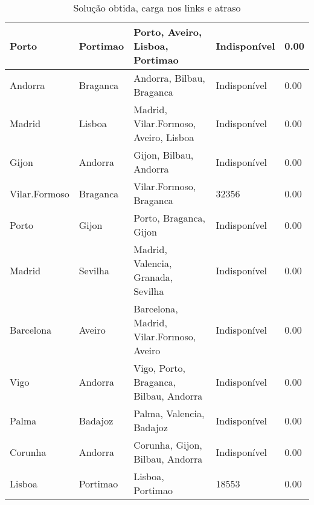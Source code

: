 \begin{table}[!htb]
{\begin{tabular}{|l|l|l|l|l|}
Porto & Portimao & Porto, Aveiro, Lisboa, Portimao & Indisponível & 0.00 \\ \hline
Andorra & Braganca & Andorra, Bilbau, Braganca & Indisponível & 0.00 \\ \hline
Madrid & Lisboa & Madrid, Vilar.Formoso, Aveiro, Lisboa & Indisponível & 0.00 \\ \hline
Gijon & Andorra & Gijon, Bilbau, Andorra & Indisponível & 0.00 \\ \hline
Vilar.Formoso & Braganca & Vilar.Formoso, Braganca & 32356 & 0.00 \\ \hline
Porto & Gijon & Porto, Braganca, Gijon & Indisponível & 0.00 \\ \hline
Madrid & Sevilha & Madrid, Valencia, Granada, Sevilha & Indisponível & 0.00 \\ \hline
Barcelona & Aveiro & Barcelona, Madrid, Vilar.Formoso, Aveiro & Indisponível & 0.00 \\ \hline
Vigo & Andorra & Vigo, Porto, Braganca, Bilbau, Andorra & Indisponível & 0.00 \\ \hline
Palma & Badajoz & Palma, Valencia, Badajoz & Indisponível & 0.00 \\ \hline
Corunha & Andorra & Corunha, Gijon, Bilbau, Andorra & Indisponível & 0.00 \\ \hline
Lisboa & Portimao & Lisboa, Portimao & 18553 & 0.00 \\ \hline
\end{tabular}}
\caption[]{Solução obtida, carga nos links e atraso}
\end{table}

